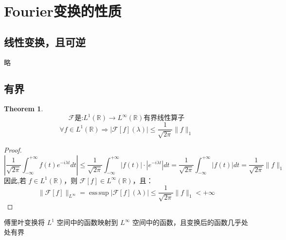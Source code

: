 \documentclass[linespread=1.5,openany]{book}%
\theoremstyle{plain}
\newtheorem{theorem}{Theorem}
\begin{document}
{{				\section{Fourier变换的性质}
				\subsection{线性变换，且可逆}
				略
				\subsection{有界}
				\begin{theorem}
					\[\mathcal{F}\text{是:}L^1(\mathbb{R})\rightarrow L^{\infty}(\mathbb{R})\text{有界线性算子}\]
					\[\forall f \in L^1(\mathbb{R})\Rightarrow|\mathcal{F}[f](\lambda)| \leq \frac{1}{\sqrt{2\pi}} \|f\|_1
					\]
				\end{theorem}
				\begin{proof}
					\[
					\left| \frac{1}{\sqrt{2\pi}} \int_{-\infty}^{+\infty} f(t) e^{-i\lambda t} dt \right|\leq \frac{1}{\sqrt{2\pi}} \int_{-\infty}^{+\infty} |f(t)|\cdot|e^{-i\lambda t}| dt = \frac{1}{\sqrt{2\pi}} \int_{-\infty}^{+\infty} |f(t)| dt = \frac{1}{\sqrt{2\pi}} \|f\|_1
					\]
					因此,若 $f \in L^1(\mathbb{R})$，则 $\mathcal{F}[f] \in L^\infty(\mathbb{R})$，且：
					\[
					\|\mathcal{F}[f]\|_{L^\infty} = \operatorname{ess\,sup} |\mathcal{F}[f](\lambda)| \leq \frac{1}{\sqrt{2\pi}} \|f\|_1 < +\infty
					\]
				\end{proof}
				傅里叶变换将 $L^1$ 空间中的函数映射到 $L^\infty$ 空间中的函数，且变换后的函数几乎处处有界
}}
\end{document}
